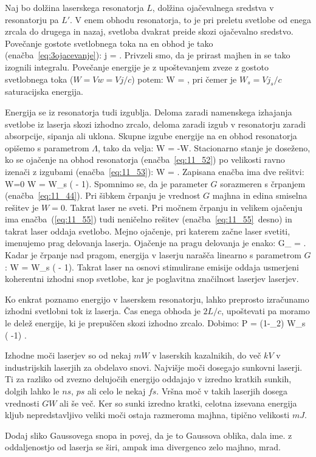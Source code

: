Naj bo dolžina laserskega resonatorja $L$, dolžina ojačevalnega sredstva 
v resonatorju pa $L'$. V enem obhodu resonatorja, to je pri preletu svetlobe
od enega zrcala do drugega in nazaj, svetloba dvakrat preide skozi ojačevalno
sredstvo. Povečanje gostote svetlobnega toka na en obhod je tako 
(enačba~\ref{eq:3ojacevanje}):
\beq
\Delta j = .
\label{eq:11_51}
\eeq
Privzeli smo, da je prirast majhen in se tako izognili integralu.
Povečanje energije je z upoštevanjem zveze z gostoto
svetlobnega toka ($W = Vw = Vj/c$) potem:
\beq
\Delta W = ,
\label{eq:11_52}
\eeq
pri čemer je $W_s = Vj_s/c$ saturacijska energija. 

Energija se iz resonatorja tudi izgublja. Deloma zaradi namenskega 
izhajanja svetlobe iz laserja skozi izhodno zrcalo, deloma zaradi 
izgub v resonatorju zaradi absorpcije, sipanja ali uklona. Skupne izgube
energije na en obhod resonatorja opišemo s parametrom $\Lambda$, tako da velja:
\beq
\Delta W = -\Lambda W.
\label{eq:11_53}
\eeq
Stacionarno stanje je doseženo, ko se ojačenje na obhod resonatorja 
(enačba~\ref{eq:11_52}) po velikosti ravno izenači z izgubami (enačba~\ref{eq:11_53}):
\beq
\Lambda W = .
\label{eq:11_54}
\eeq
Zapisana enačba ima dve rešitvi:
\beq
W=0 \qquad {} \qquad W = W_s \left( - 1\right)\!\!.
\label{eq:11_55}
\eeq
Spomnimo se, da je parameter $G$ sorazmeren s črpanjem 
(enačba~\ref{eq:11_44}). Pri šibkem črpanju je vrednost $G$ majhna in 
edina smiselna rešitev je $W=0$. Takrat laser ne sveti. Pri močnem
črpanju in velikem ojačenju ima enačba~(\ref{eq:11_55}) tudi neničelno
rešitev (enačba~\ref{eq:11_55}\, desno) in takrat laser oddaja svetlobo. 
Mejno ojačenje, pri katerem začne laser svetiti, imenujemo prag 
delovanja laserja. Ojačenje na pragu delovanja je enako:
\beq
G_ = .
\label{eq:11_56}
\eeq
Kadar je črpanje nad pragom, energija v laserju narašča linearno s 
parametrom $G$:
\beq
W = W_s \left( - 1\right)\!\!.
\label{eq:11_57}
\eeq
Takrat laser na osnovi stimulirane emisije oddaja usmerjeni 
koherentni izhodni snop svetlobe, kar je poglavitna značilnost laserjev laserjev.

Ko enkrat poznamo energijo v laserskem resonatorju, lahko preprosto
izračunamo izhodni svetlobni tok iz laserja. Čas enega obhoda je $2L/c$,
upoštevati pa moramo le delež energije, ki je prepuščen skozi izhodno zrcalo. 
Dobimo: 
\beq
P = (1-_2) W_s \left( -1\right) .
\label{eq:11_58}
\eeq
\begin{remark}
Izhodne moči laserjev so od nekaj $\si{mW}$ v laserskih kazalnikih, do 
več $\si{kV}$ v industrijskih laserjih za obdelavo snovi. Najvišje moči 
dosegajo sunkovni laserji. Ti za razliko od zvezno delujočih energijo oddajajo
v izredno kratkih sunkih, dolgih lahko le $\si{ns}$, $\si{ps}$ ali celo 
le nekaj $\si{fs}$. Vršna moč v takih laserjih dosega
vrednosti $\si{GW}$ ali še več. Ker so sunki izredno kratki, celotna izsevana 
energija kljub nepredstavljivo veliki moči ostaja razmeroma majhna, tipično 
velikosti $\si{mJ}$.
\end{remark}

Dodaj sliko Gaussovega snopa in povej, da je to Gaussova oblika, dala ime. 
z oddaljenostjo od laserja se širi, ampak ima divergenco zelo majhno, mrad.
